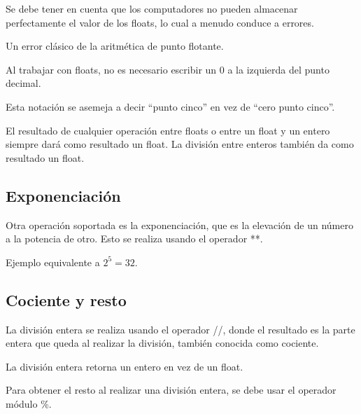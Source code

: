 \documentclass{article}
\newcommand{\doble}[1]{``#1''}
\begin{document}
Se debe tener en cuenta que los computadores no pueden almacenar perfectamente el valor de los floats, lo cual a menudo conduce a errores.

\begin{listing*}[ht!]
  \caption{Un error clásico de la aritmética de punto flotante.}
\end{listing*}

Al trabajar con floats, no es necesario escribir un 0 a la izquierda del punto decimal.

\begin{listing*}[ht!]
  \caption{Esta notación se asemeja a decir \doble{punto cinco} en vez de \doble{cero punto cinco}.}
\end{listing*}

El resultado de cualquier operación entre floats o entre un float y un entero siempre dará como resultado un float. La división entre enteros también da como resultado un float.


\subsection{Exponenciación}

Otra operación soportada es la exponenciación, que es la elevación de un número a la potencia de otro. Esto se realiza usando el operador **.

\begin{listing*}[ht!]
  \caption{Ejemplo equivalente a $2 ^ 5 = 32$.}
\end{listing*}

\subsection{Cociente y resto}

La división entera se realiza usando el operador //, donde el resultado es la parte entera que queda al realizar la división, también conocida como cociente.
  
\begin{listing*}[ht!]
  \caption{La división entera retorna un entero en vez de un float.}
\end{listing*}

Para obtener el resto al realizar una división entera, se debe usar el operador módulo \%.
\end{document}

